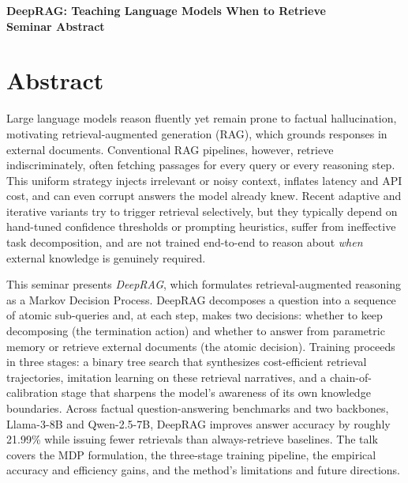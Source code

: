 \documentclass[11pt]{article}
\begin{document}
\begin{center}
{\LARGE\bfseries DeepRAG: Teaching Language Models When to Retrieve}\\[1.1em]
{\large\bfseries Seminar Abstract}\\[0.6em]
{\normalsize \seminarDate}
\end{center}
\vspace{0.6em}
\section*{Abstract}
Large language models reason fluently yet remain prone to factual hallucination, motivating retrieval-augmented generation (RAG), which grounds responses in external documents. Conventional RAG pipelines, however, retrieve indiscriminately, often fetching passages for every query or every reasoning step. This uniform strategy injects irrelevant or noisy context, inflates latency and API cost, and can even corrupt answers the model already knew. Recent adaptive and iterative variants try to trigger retrieval selectively, but they typically depend on hand-tuned confidence thresholds or prompting heuristics, suffer from ineffective task decomposition, and are not trained end-to-end to reason about \emph{when} external knowledge is genuinely required.

This seminar presents \emph{DeepRAG}, which formulates retrieval-augmented reasoning as a Markov Decision Process. DeepRAG decomposes a question into a sequence of atomic sub-queries and, at each step, makes two decisions: whether to keep decomposing (the termination action) and whether to answer from parametric memory or retrieve external documents (the atomic decision). Training proceeds in three stages: a binary tree search that synthesizes cost-efficient retrieval trajectories, imitation learning on these retrieval narratives, and a chain-of-calibration stage that sharpens the model's awareness of its own knowledge boundaries. Across factual question-answering benchmarks and two backbones, Llama-3-8B and Qwen-2.5-7B, DeepRAG improves answer accuracy by roughly 21.99\% while issuing fewer retrievals than always-retrieve baselines. The talk covers the MDP formulation, the three-stage training pipeline, the empirical accuracy and efficiency gains, and the method's limitations and future directions.
\end{document}
